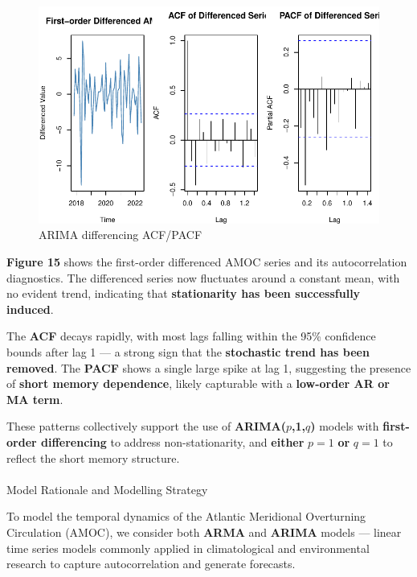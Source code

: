 \documentclass[
  11pt,
]{article}
\makeatletter
\let\oldparagraph\paragraph
\renewcommand{\paragraph}{
    \@ifstar
      \xxxParagraphStar
      \xxxParagraphNoStar
  }
\newcommand{\xxxParagraphStar}[1]{\oldparagraph*{#1}\mbox{}}
\newcommand{\xxxParagraphNoStar}[1]{\oldparagraph{#1}\mbox{}}
\makeatother
\begin{document}
\begin{figure}[H]

{\centering \includegraphics{project_files/figure-pdf/fig-diff-acf-pacf-1.pdf}

}

\caption{ARIMA differencing ACF/PACF}

\end{figure}%

\textbf{Figure 15} shows the first-order differenced AMOC series and its
autocorrelation diagnostics. The differenced series now fluctuates
around a constant mean, with no evident trend, indicating that
\textbf{stationarity has been successfully induced}.

The \textbf{ACF} decays rapidly, with most lags falling within the 95\%
confidence bounds after lag 1 --- a strong sign that the
\textbf{stochastic trend has been removed}. The \textbf{PACF} shows a
single large spike at lag 1, suggesting the presence of \textbf{short
memory dependence}, likely capturable with a \textbf{low-order AR or MA
term}.

These patterns collectively support the use of
\textbf{ARIMA(}\(p\)\textbf{,1,}\(q\)\textbf{)} models with
\textbf{first-order differencing} to address non-stationarity, and
\textbf{either} \(p=1\) \textbf{or} \(q=1\) to reflect the short memory
structure.

\paragraph{Model Rationale and Modelling
Strategy}\label{model-rationale-and-modelling-strategy}

To model the temporal dynamics of the Atlantic Meridional Overturning
Circulation (AMOC), we consider both \textbf{ARMA} and \textbf{ARIMA}
models --- linear time series models commonly applied in climatological
and environmental research to capture autocorrelation and generate
forecasts.
\end{document}
